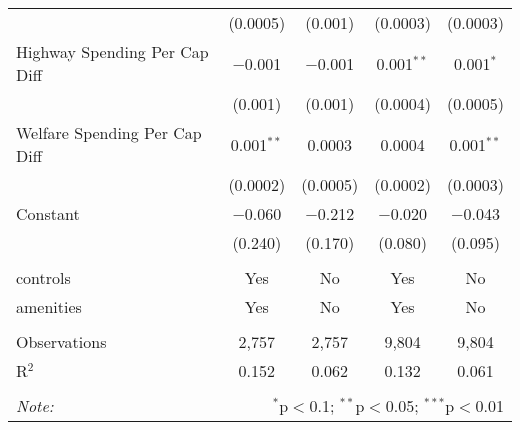 \begin{table}[!htbp]
\begin{tabular}{@{\extracolsep{5pt}}lcccc}
  & (0.0005) & (0.001) & (0.0003) & (0.0003) \\ 
  Highway Spending Per Cap Diff & $-$0.001 & $-$0.001 & 0.001$^{**}$ & 0.001$^{*}$ \\ 
  & (0.001) & (0.001) & (0.0004) & (0.0005) \\ 
  Welfare Spending Per Cap Diff & 0.001$^{**}$ & 0.0003 & 0.0004 & 0.001$^{**}$ \\ 
  & (0.0002) & (0.0005) & (0.0002) & (0.0003) \\ 
  Constant & $-$0.060 & $-$0.212 & $-$0.020 & $-$0.043 \\ 
  & (0.240) & (0.170) & (0.080) & (0.095) \\ 
 \hline \\[-1.8ex] 
controls & Yes & No & Yes & No \\ 
amenities & Yes & No & Yes & No \\ 
\hline \\[-1.8ex] 
Observations & 2,757 & 2,757 & 9,804 & 9,804 \\ 
R$^{2}$ & 0.152 & 0.062 & 0.132 & 0.061 \\ 
\hline 
\hline \\[-1.8ex] 
\textit{Note:}  & \multicolumn{4}{r}{$^{*}$p$<$0.1; $^{**}$p$<$0.05; $^{***}$p$<$0.01} \\ 
\end{tabular} 
\end{table} 
